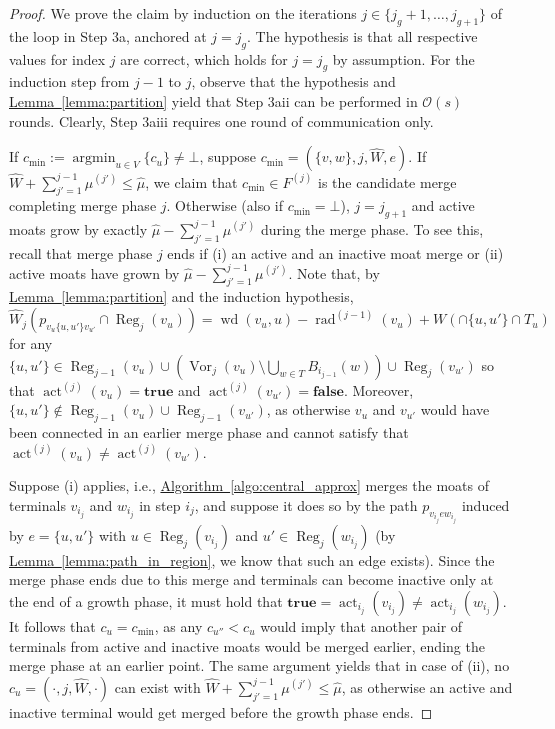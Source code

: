 \documentclass[letterpaper,11pt]{article}
\newcommand{\namedref}[2]{\hyperref[#2]{#1~\ref*{#2}}}
\newcommand{\lemmaref}[1]{\namedref{Lemma}{#1}}
\newcommand{\algref}[1]{\namedref{Algorithm}{#1}}
\newcommand{\BO}{\mathcal{O}}
\DeclareMathOperator{\act}{act}
\DeclareMathOperator{\moat}{rad}
\DeclareMathOperator{\Wd}{wd}
\DeclareMathOperator{\reg}{Reg}
\DeclareMathOperator{\vor}{Vor}
\DeclareMathOperator*{\argmin}{argmin}
\newcommand{\true}{\mathbf{true}}
\newcommand{\false}{\mathbf{false}}
\begin{document}
\begin{proof}
We prove the claim by induction on the iterations $j\in
\{j_g+1,\ldots,j_{g+1}\}$ of the loop in Step 3a, anchored at $j=j_g$. The
hypothesis is that all respective values for index $j$ are correct, which holds
for $j=j_g$ by assumption. For the induction step from $j-1$ to $j$, observe
that the hypothesis and \lemmaref{lemma:partition} yield that Step 3aii can be
performed in $\BO(s)$ rounds. Clearly, Step 3aiii requires one round of
communication only.

If $c_{\min}:=\argmin_{u\in V}\{c_u\}\neq \bot$, suppose
$c_{\min}=(\{v,w\},j,\hat{W},e)$. If $\hat{W}+\sum_{j'=1}^{j-1}\mu^{(j')}\leq
\hat{\mu}$, we claim that $c_{\min}\in F^{(j)}$ is the candidate merge
completing merge phase $j$. Otherwise (also if $c_{\min}=\bot$), $j=j_{g+1}$ and
active moats grow by exactly $\hat{\mu}-\sum_{j'=1}^{j-1}\mu^{(j')}$ during the
merge phase. To see this, recall that merge phase $j$ ends if (i) an active and
an inactive moat merge or (ii) active moats have grown by
$\hat{\mu}-\sum_{j'=1}^{j-1}\mu^{(j')}$. Note that, by
\lemmaref{lemma:partition} and the induction hypothesis,
\begin{equation*}
\hat{W}_j(p_{v_u\{u,u'\}v_{u'}}\cap
\reg_j(v_u))=\Wd(v_u,u)-\moat^{(j-1)}(v_u)+W(\cap\{u,u'\}\cap T_u)
\end{equation*}
for any $\{u,u'\}\in \reg_{j-1}(v_u)\cup (\vor_j(v_u)\setminus \bigcup_{w\in
T}B_{i_{j-1}}(w))\cup \reg_j(v_{u'})$ so that $\act^{(j)}(v_u)=\true$ and
$\act^{(j)}(v_{u'})=\false$. Moreover, $\{u,u'\}\notin \reg_{j-1}(v_u)\cup
\reg_{j-1}(v_{u'})$, as otherwise $v_u$ and $v_{u'}$ would have been connected
in an earlier merge phase and cannot satisfy that $\act^{(j)}(v_u)\neq
\act^{(j)}(v_{u'})$.

Suppose (i) applies, i.e., \algref{algo:central_approx} merges the moats of
terminals $v_{i_j}$ and $w_{i_j}$ in step $i_j$, and suppose it does so by the
path $p_{v_{i_j}ew_{i_j}}$ induced by $e= \{u,u'\}$ with $u\in \reg_j(v_{i_j})$
and $u'\in \reg_j(w_{i_j})$ (by \lemmaref{lemma:path_in_region}, we know that
such an edge exists). Since the merge phase ends due to this merge and terminals
can become inactive only at the end of a growth phase, it must hold that
$\true=\act_{i_j}(v_{i_j})\neq \act_{i_j}(w_{i_j})$. It follows that
$c_u=c_{\min}$, as any $c_{u''}<c_u$ would imply that another pair of terminals
from active and inactive moats would be merged earlier, ending the merge phase
at an earlier point. The same argument yields that in case of (ii), no
$c_u=(\cdot,j,\hat{W},\cdot)$ can exist with
$\hat{W}+\sum_{j'=1}^{j-1}\mu^{(j')}\leq \hat{\mu}$, as otherwise an active and
inactive terminal would get merged before the growth phase ends.


\end{proof}
\end{document}
